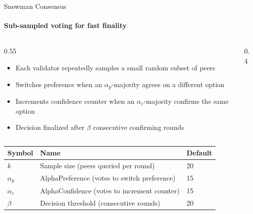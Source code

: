\documentclass[aspectratio=169]{beamer}
\begin{document}
\begin{frame}[shrink=5]{Snowman Consensus}
	\framesubtitle{Sub-sampled voting for fast finality}

	\begin{columns}[c]
		\begin{column}{0.55\textwidth}
			\begin{itemize}
				\item Each validator repeatedly samples a small random subset of peers
				\item Switches preference when an $\alpha_p$-majority agrees on a different option
				\item Increments confidence counter when an $\alpha_c$-majority confirms the same option
				\item Decision finalized after $\beta$ consecutive confirming rounds
			\end{itemize}
		\end{column}
		\begin{column}{0.4\textwidth}
		\end{column}
	\end{columns}

	\vspace{0.3em}
	{\small\begin{tabular}{@{}lll@{}}
		\toprule
		Symbol & Name & Default \\
		\midrule
		$k$          & Sample size (peers queried per round)            & 20 \\
		$\alpha_p$   & AlphaPreference (votes to switch preference)     & 15 \\
		$\alpha_c$   & AlphaConfidence (votes to increment counter)     & 15 \\
		$\beta$      & Decision threshold (consecutive rounds)          & 20 \\
		\bottomrule
	\end{tabular}}
\end{frame}
\end{document}
